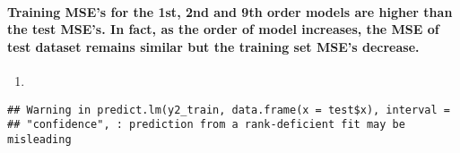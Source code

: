 \documentclass[]{article}
\newenvironment{Shaded}{\begin{snugshade}}{\end{snugshade}}
\newcommand{\CommentTok}[1]{\textcolor[rgb]{0.56,0.35,0.01}{\textit{#1}}}
\newcommand{\DataTypeTok}[1]{\textcolor[rgb]{0.13,0.29,0.53}{#1}}
\newcommand{\FloatTok}[1]{\textcolor[rgb]{0.00,0.00,0.81}{#1}}
\newcommand{\KeywordTok}[1]{\textcolor[rgb]{0.13,0.29,0.53}{\textbf{#1}}}
\newcommand{\NormalTok}[1]{#1}
\newcommand{\OperatorTok}[1]{\textcolor[rgb]{0.81,0.36,0.00}{\textbf{#1}}}
\newcommand{\StringTok}[1]{\textcolor[rgb]{0.31,0.60,0.02}{#1}}
\let\oldparagraph\paragraph
\renewcommand{\paragraph}[1]{\oldparagraph{#1}\mbox{}}
\begin{document}
\hypertarget{training-mses-for-the-1st-2nd-and-9th-order-models-are-higher-than-the-test-mses.-in-fact-as-the-order-of-model-increases-the-mse-of-test-dataset-remains-similar-but-the-training-set-mses-decrease.}{%
\paragraph{Training MSE's for the 1st, 2nd and 9th order models are
higher than the test MSE's. In fact, as the order of model increases,
the MSE of test dataset remains similar but the training set MSE's
decrease.}\label{training-mses-for-the-1st-2nd-and-9th-order-models-are-higher-than-the-test-mses.-in-fact-as-the-order-of-model-increases-the-mse-of-test-dataset-remains-similar-but-the-training-set-mses-decrease.}}

\begin{enumerate}
\def\labelenumi{(\alph{enumi})}
\setcounter{enumi}{3}
\item
\end{enumerate}

\begin{Shaded}
\end{Shaded}

\begin{verbatim}
## Warning in predict.lm(y2_train, data.frame(x = test$x), interval =
## "confidence", : prediction from a rank-deficient fit may be misleading
\end{verbatim}

\begin{Shaded}
\end{Shaded}
\end{document}
